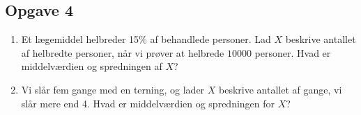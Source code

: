 \subsection*{Opgave 4}
\begin{enumerate}[label=\roman*)]
\item Et lægemiddel helbreder 15$\%$ af behandlede personer. Lad $X$ beskrive antallet af helbredte personer, når vi prøver at helbrede $10000$ personer. Hvad er middelværdien og spredningen af $X$?
\item Vi slår fem gange med en terning, og lader $X$ beskrive antallet af gange, vi slår mere end 4. Hvad er middelværdien og spredningen for $X$?
\end{enumerate}

